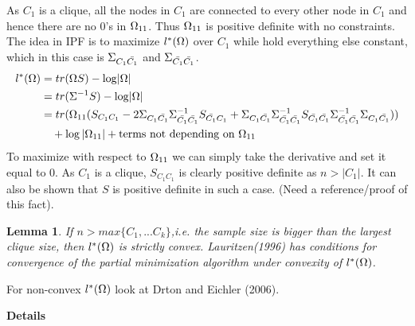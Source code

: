 \documentclass[12pt, leqno]{article}
\providecommand{\abs}[1]{\lvert#1\rvert}
\def\s{\ensuremath\Sigma}
\def\om{\ensuremath\Omega}
\newtheorem{lemma}{Lemma}[]
\begin{document}
As $C_1$ is a clique, all the nodes in $C_1$ are connected to every
other node in $C_1$ and hence there are no 0's in $\om_{11}$. Thus
 $\om_{11}$ is positive definite with no constraints. The idea in IPF
 is to maximize $l^{*}(\om)$ over $C_1$ while hold everything else
 constant, which in this case is $\s_{{C_1} \bar{C_1}}$ and
 $\s_{\bar{C_1} \bar{C_1}}$.
\begin{align*}
l^{*}(\om) &= tr (\om S) - \log \abs{\om} \\
&= tr (\s^{-1} S) - \log \abs{\om} \\
& =  tr(\om_{11} (S_{C_1 C_1} -2 \s_{C_1 \bar{C_1}} \s_{\bar{C_1}
  \bar{C_1}}^{-1} S_{{\bar{C_1} {C_1}}}  
+ \s_{{C_1
           \bar{C_1}}} \s_{\bar{C_1}
  \bar{C_1}}^{-1}  S_{{\bar{C_1} \bar{C_1}}} \s_{\bar{C_1}
  \bar{C_1}}^{-1} \s_{C_1 \bar{C_1}})) \\ 
& \quad  + \log{\abs{\om_{11}}} + \text{terms not depending on } \om_{11}
\end{align*}
 To maximize with respect to $\om_{11}$ we can simply take the
 derivative and set it equal to 0. As $C_1$ is a clique, $S_{C_1 C_1}$
 is clearly positive definite as $n>\abs{C_1}$. It can also be shown
 that $S$ is positive definite in such a case. (Need a reference/proof
 of this fact).
\begin{lemma}If $n>max\{C_1,...C_k\}$,i.e. the sample size is bigger than the largest
clique size, then $l^{*}(\om)$ is strictly convex. 
Lauritzen(1996) has conditions for convergence of the partial
minimization algorithm under convexity of $l^{*}(\om)$. 
\end{lemma}
For non-convex
$l^{*}(\om)$ look at Drton and Eichler (2006).

\textbf{Details}
\end{document}
